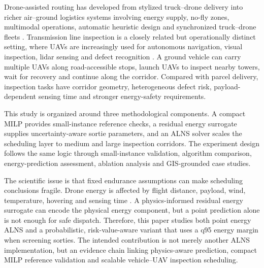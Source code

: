 \documentclass[final,5p,twocolumn,number,nopreprintline]{elsarticle}
\newcommand{\rev}[1]{{\color{blue}#1}}
\begin{document}
Drone-assisted routing has developed from stylized truck--drone delivery into richer air--ground logistics systems involving energy supply, no-fly zones, multimodal operations, automatic heuristic design and synchronized truck--drone fleets \cite{murray2015flying,dorling2017vehicle,otto2018survey,kim2026bidirectional,liu2026evtol,zhang2026airground,shi2026llm,yang2025integrated}. Transmission line inspection is a closely related but operationally distinct setting, where UAVs are increasingly used for autonomous navigation, visual inspection, lidar sensing and defect recognition \cite{hui2019monocular,li2021uavtransmission,nguyen2018visionreview,liu2021uavlidar,zhang2020visualinspection}. A ground vehicle can carry multiple UAVs along road-accessible stops, launch UAVs to inspect nearby towers, wait for recovery and continue along the corridor. Compared with parcel delivery, inspection tasks have corridor geometry, heterogeneous defect risk, payload-dependent sensing time and stronger energy-safety requirements.

\rev{This study is organized around three methodological components. A compact MILP provides small-instance reference checks, a residual energy surrogate supplies uncertainty-aware sortie parameters, and an ALNS solver scales the scheduling layer to medium and large inspection corridors. The experiment design follows the same logic through small-instance validation, algorithm comparison, energy-prediction assessment, ablation analysis and GIS-grounded case studies.}

The scientific issue is that fixed endurance assumptions can make scheduling conclusions fragile. Drone energy is affected by flight distance, payload, wind, temperature, hovering and sensing time \cite{stolaroff2018energy,zhang2021energyconsumption,aiello2021energy,chiang2019sustainability,cokyasar2023regional}. A physics-informed residual energy surrogate can encode the physical energy component, but a point prediction alone is not enough for safe dispatch. Therefore, this paper studies both point energy ALNS and a probabilistic, risk-value-aware variant that uses a q95 energy margin when screening sorties. The intended contribution is not merely another ALNS implementation, but an evidence chain linking physics-aware prediction, compact MILP reference validation and scalable vehicle--UAV inspection scheduling.
\end{document}
